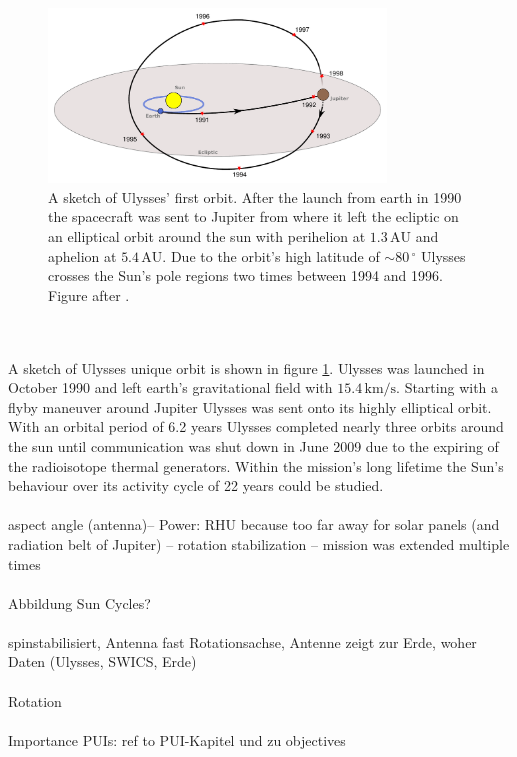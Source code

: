 \begin{figure}[h]
	\includegraphics[width=0.8\textwidth]{Figures/ulysses_trajectory.pdf}
	\centering
	\caption{A sketch of Ulysses' first orbit. After the launch from earth in 1990 the spacecraft was sent to Jupiter from where it left the ecliptic on an elliptical orbit around the sun with perihelion at $1.3\,\mathrm{AU}$ and aphelion at $5.4\,\mathrm{AU}$. Due to the orbit's high latitude of $\sim 80 \, ^\circ$ Ulysses crosses the Sun's pole regions two times between 1994 and 1996. Figure after \citet{esa_orbit}.}
	\label{fig:trajectory}
\end{figure}
\\ \\
A sketch of Ulysses unique orbit is shown in figure \ref{fig:trajectory}.
Ulysses was launched in October 1990 and left earth's gravitational field with $15.4\,\mathrm{km/s}$. Starting with a flyby maneuver around Jupiter Ulysses was sent onto its highly elliptical orbit.
With an orbital period of 6.2 years Ulysses completed nearly three orbits around the sun until communication was shut down in June 2009 due to the expiring of the radioisotope thermal generators.
Within the mission's long lifetime the Sun's behaviour over its activity cycle of 22 years could be studied. 
\\ \\
aspect angle (antenna)-- Power: RHU because too far away for solar panels (and radiation belt of Jupiter) -- rotation stabilization --  mission was extended multiple times
\\ \\
Abbildung Sun Cycles?
\\ \\ 
spinstabilisiert, Antenna fast Rotationsachse, Antenne zeigt zur Erde, woher Daten (Ulysses, SWICS, Erde)
\\ \\
Rotation
\\ \\ 
Importance PUIs: ref to PUI-Kapitel und zu objectives
%
%
%
%
%
